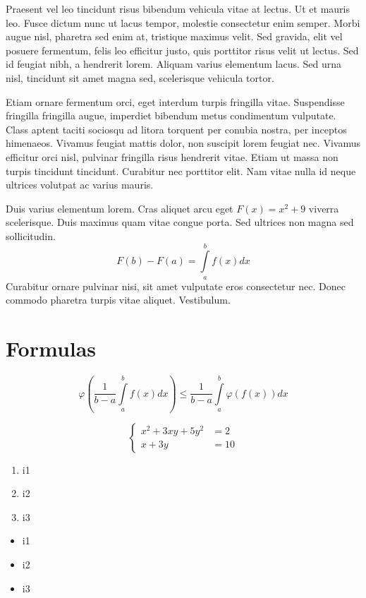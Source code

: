 \documentclass[14px, a4paper]{article}
\begin{document}
	Praesent vel leo tincidunt risus bibendum vehicula vitae at lectus. Ut et mauris leo. Fusce dictum nunc ut lacus tempor, molestie consectetur enim semper. Morbi augue nisl, pharetra sed enim at, tristique maximus velit. Sed gravida, elit vel posuere fermentum, felis leo efficitur justo, quis porttitor risus velit ut lectus. Sed id feugiat nibh, a hendrerit lorem. Aliquam varius elementum lacus. Sed urna nisl, tincidunt sit amet magna sed, scelerisque vehicula tortor.
	
	Etiam ornare fermentum orci, eget interdum turpis fringilla vitae. Suspendisse fringilla fringilla augue, imperdiet bibendum metus condimentum vulputate. Class aptent taciti sociosqu ad litora torquent per conubia nostra, per inceptos himenaeos. Vivamus feugiat mattis dolor, non suscipit lorem feugiat nec. Vivamus efficitur orci nisl, pulvinar fringilla risus hendrerit vitae. Etiam ut massa non turpis tincidunt tincidunt. Curabitur nec porttitor elit. Nam vitae nulla id neque ultrices volutpat ac varius mauris.
	
	Duis varius elementum lorem. Cras aliquet arcu eget $F(x) = x^2 + 9$ viverra scelerisque. Duis maximus quam vitae                                     congue porta. Sed ultrices non magna sed sollicitudin. $$F(b) - F(a) = \int\limits_a^b f(x) dx$$ Curabitur ornare pulvinar nisi, sit amet vulputate eros consectetur nec. Donec commodo pharetra turpis vitae aliquet. Vestibulum.
	
	\section{Formulas}
	
	
	$$\varphi\left(\frac{1}{b-a}\int\limits_a^b f(x) dx\right) \leqslant \frac{1}{b-a}\int\limits_a^b \varphi(f(x)) dx$$
	
	$$
		\begin{cases}
			x^2 + 3xy + 5y^2 &= 2\\
			x + 3y &= 10
		\end{cases}
	$$
	
	\begin{enumerate}
		\item i1
		
		\item i2
		
		\item i3
	\end{enumerate}
	
	\begin{itemize}
		\item i1
		
		\item i2
		
		\item i3
	\end{itemize}
\end{document}
